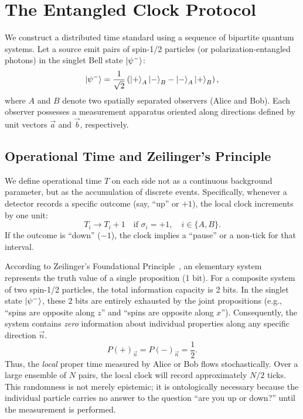 \documentclass[entropy,article,submit,moreauthors,pdftex]{Definitions/mdpi}
\begin{document}
\section{The Entangled Clock Protocol}

We construct a distributed time standard using a sequence of bipartite quantum systems. Let a source emit pairs of spin-1/2 particles (or polarization-entangled photons) in the singlet Bell state $\ket{\psi^-}$:
\begin{equation}
\ket{\psi^-} = \frac{1}{\sqrt{2}} \left( \ket{+}_A \ket{-}_B - \ket{-}_A \ket{+}_B \right),
\end{equation}
where $A$ and $B$ denote two spatially separated observers (Alice and Bob). Each observer possesses a measurement apparatus oriented along directions defined by unit vectors $\vec{a}$ and $\vec{b}$, respectively.

\subsection{Operational Time and Zeilinger's Principle}

We define operational time $T$ on each side not as a continuous background parameter, but as the accumulation of discrete events. Specifically, whenever a detector records a specific outcome (say, ``up'' or $+1$), the local clock increments by one unit:
\begin{equation}
T_i \to T_i + 1 \quad \text{if } \sigma_i = +1, \quad i \in \{A, B\}.
\end{equation}
If the outcome is ``down'' ($-1$), the clock implies a ``pause'' or a non-tick for that interval.

According to Zeilinger's Foundational Principle~\cite{zeil-99}, an elementary system represents the truth value of a single proposition (1 bit). For a composite system of two spin-1/2 particles, the total information capacity is 2 bits. In the singlet state $\ket{\psi^-}$, these 2 bits are entirely exhausted by the joint propositions (e.g., ``spins are opposite along $z$'' and ``spins are opposite along $x$''). Consequently, the system contains \emph{zero} information about individual properties along any specific direction $\vec{n}$.
\begin{equation}
P(+)_{\vec{n}} = P(-)_{\vec{n}} = \frac{1}{2}.
\end{equation}
Thus, the \emph{local} proper time measured by Alice or Bob flows stochastically. Over a large ensemble of $N$ pairs, the local clock will record approximately $N/2$ ticks. This randomness is not merely epistemic; it is ontologically necessary because the individual particle carries no answer to the question ``are you up or down?'' until the measurement is performed.
\end{document}
